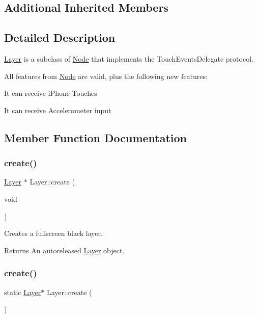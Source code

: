 \subsection*{Additional Inherited Members}


\subsection{Detailed Description}
\hyperlink{classLayer}{Layer} is a subclass of \hyperlink{classNode}{Node} that implements the Touch\+Events\+Delegate protocol. 

All features from \hyperlink{classNode}{Node} are valid, plus the following new features\+:
\begin{DoxyItemize}
\item It can receive i\+Phone Touches
\item It can receive Accelerometer input 
\end{DoxyItemize}

\subsection{Member Function Documentation}
\mbox{\label{classLayer_a779e4a3b9a3b2218a972b84f77a7ca04}} 
\subsubsection{\texorpdfstring{create()}{create()}\hspace{0.1cm}{\footnotesize\ttfamily [1/2]}}
{\footnotesize\ttfamily \hyperlink{classLayer}{Layer} $\ast$ Layer\+::create (\begin{DoxyParamCaption}\item[{void}]{ }\end{DoxyParamCaption})\hspace{0.3cm}{\ttfamily [static]}}

Creates a fullscreen black layer.

\begin{DoxyReturn}{Returns}
An autoreleased \hyperlink{classLayer}{Layer} object. 
\end{DoxyReturn}
\mbox{\label{classLayer_a53a8d19f9f175f842a3316196b664d1e}} 
\subsubsection{\texorpdfstring{create()}{create()}\hspace{0.1cm}{\footnotesize\ttfamily [2/2]}}
{\footnotesize\ttfamily static \hyperlink{classLayer}{Layer}$\ast$ Layer\+::create (\begin{DoxyParamCaption}{ }\end{DoxyParamCaption})\hspace{0.3cm}{\ttfamily [static]}}

